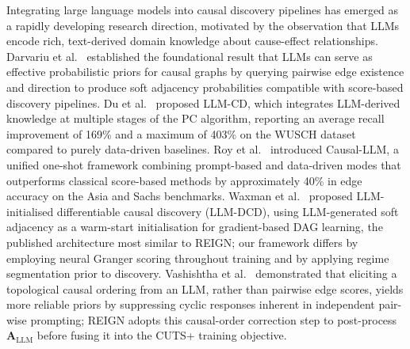 Integrating large language models into causal discovery pipelines has
emerged as a rapidly developing research direction, motivated by the
observation that LLMs encode rich, text-derived domain knowledge about
cause-effect relationships.
Darvariu et al.~\cite{Darvariu2024} established the foundational result
that LLMs can serve as effective probabilistic priors for causal graphs
by querying pairwise edge existence and direction to produce soft
adjacency probabilities compatible with score-based discovery pipelines.
Du et al.~\cite{Du2025} proposed LLM-CD, which integrates LLM-derived
knowledge at multiple stages of the PC algorithm, reporting an average
recall improvement of 169\% and a maximum of 403\% on the WUSCH dataset
compared to purely data-driven baselines.
Roy et al.~\cite{Roy2025} introduced Causal-LLM, a unified one-shot
framework combining prompt-based and data-driven modes that outperforms
classical score-based methods by approximately 40\% in edge accuracy
on the Asia and Sachs benchmarks.
Waxman et al.~\cite{Waxman2024} proposed LLM-initialised differentiable
causal discovery (LLM-DCD), using LLM-generated soft adjacency as a
warm-start initialisation for gradient-based DAG learning, the published
architecture most similar to REIGN; our framework differs by employing
neural Granger scoring throughout training and by applying regime
segmentation prior to discovery.
Vashishtha et al.~\cite{Vashishtha2025} demonstrated that eliciting a
topological causal ordering from an LLM, rather than pairwise edge scores,
yields more reliable priors by suppressing cyclic responses inherent in
independent pair-wise prompting; REIGN adopts this causal-order correction
step to post-process $\mathbf{A}_{\mathrm{LLM}}$ before fusing it into
the CUTS+ training objective.

